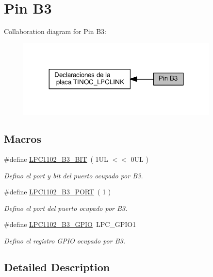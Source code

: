\hypertarget{group___p_i_n_b3}{}\section{Pin B3}
\label{group___p_i_n_b3}
Collaboration diagram for Pin B3\+:\nopagebreak
\begin{figure}[H]
\begin{center}
\leavevmode
\includegraphics[width=287pt]{group___p_i_n_b3}
\end{center}
\end{figure}
\subsection*{Macros}
\begin{DoxyCompactItemize}
\item 
\#define \hyperlink{group___p_i_n_b3_ga39bcaf57d33e1054d42f18cdb09ee3f3}{L\+P\+C1102\+\_\+\+B3\+\_\+\+B\+IT}~( 1\+U\+L $<$$<$ 0\+U\+L )
\begin{DoxyCompactList}\small\item\em Defino el port y bit del puerto ocupado por B3. \end{DoxyCompactList}\item 
\#define \hyperlink{group___p_i_n_b3_ga2d2cd4b200ff348a009d8893cbeefaf8}{L\+P\+C1102\+\_\+\+B3\+\_\+\+P\+O\+RT}~( 1 )
\begin{DoxyCompactList}\small\item\em Defino el port del puerto ocupado por B3. \end{DoxyCompactList}\item 
\#define \hyperlink{group___p_i_n_b3_gab894d5a6e82d3bb1548150fa1f903c84}{L\+P\+C1102\+\_\+\+B3\+\_\+\+G\+P\+IO}~L\+P\+C\+\_\+\+G\+P\+I\+O1
\begin{DoxyCompactList}\small\item\em Defino el registro G\+P\+IO ocupado por B3. \end{DoxyCompactList}\end{DoxyCompactItemize}


\subsection{Detailed Description}


